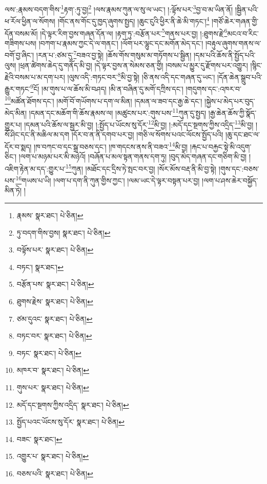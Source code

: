ལས་:རྣམས་བདག་གིས་\footnote{རྣམས་  སྣར་ཐང་།  པེ་ཅིན། }རྟག་:ཏུ་བྱ།\footnote{ཏུ་བདག་གིས་བྱས།  སྣར་ཐང་།  པེ་ཅིན། } །ལས་རྣམས་ཀུན་ལ་སུ་ལ་ཡང་། །:ལྟོས་པར་\footnote{བལྟོས་པར་  སྣར་ཐང་།  པེ་ཅིན། }བྱ་བ་མ་ཡིན་ནོ། །སྦྱིན་པའི་ཕ་རོལ་ཕྱིན་ལ་སོགས། །གོང་ནས་གོང་དུ་ཁྱད་ཞུགས་སྤྱད། །ཆུང་ངུའི་ཕྱིར་ནི་ཆེ་མི་གཏང་།\footnote{བཏང་།  སྣར་ཐང་། } །གཙོ་ཆེར་གཞན་གྱི་དོན་བསམ་མོ། །དེ་ལྟར་རིག་བྱས་གཞན་དོན་ལ། །རྟག་ཏུ་:བརྩོན་པར་\footnote{བརྩོན་པས་  སྣར་ཐང་།  པེ་ཅིན། }གནས་པར་བྱ། །:ཐུགས་རྗེ་\footnote{ཐུགས་རྗེས་  སྣར་ཐང་།  པེ་ཅིན། }མངའ་བ་རིང་གཟིགས་པས། །བཀག་པ་རྣམས་ཀྱང་དེ་ལ་གནང་། །ལོག་པར་ལྷུང་དང་མགོན་མེད་དང་། །བརྟུལ་ཞུགས་གནས་ལ་བགོ་བྱ་ཞིང་། །རན་པ་:ཙམ་དུ་\footnote{ཙམ་དུའང་  སྣར་ཐང་།  པེ་ཅིན། }བཟའ་བྱ་སྟེ། །ཆོས་གོས་གསུམ་མ་གཏོགས་པ་སྦྱིན། །དམ་པའི་ཆོས་ནི་སྤྱོད་པའི་ལུས། །ཕྲན་ཚེགས་ཆེད་དུ་གནོད་མི་བྱ། །དེ་ལྟར་བྱས་ན་སེམས་ཅན་གྱི། །བསམ་པ་མྱུར་དུ་རྫོགས་པར་འགྱུར། །སྙིང་རྗེའི་བསམ་པ་མ་དག་པར། །ལུས་འདི་:གཏང་བར་\footnote{བཏང་བར་  སྣར་ཐང་།  པེ་ཅིན། }མི་བྱ་སྟེ། །ཅི་ནས་འདི་དང་གཞན་དུ་ཡང་། །དོན་ཆེན་སྒྲུབ་པའི་རྒྱུར་གཏང་\footnote{བཏང་  སྣར་ཐང་།  པེ་ཅིན། }ངོ། །མ་གུས་པ་ལ་ཆོས་མི་བཤད། །མི་ན་བཞིན་དུ་མགོ་དཀྲིས་དང་། །གདུགས་དང་:འཁར་བ་\footnote{མཁར་བ་  སྣར་ཐང་།  པེ་ཅིན། }མཚོན་ཐོགས་དང་། །མགོ་བོ་གཡོགས་པ་དག་ལ་མིན། །དམན་ལ་ཟབ་དང་རྒྱ་ཆེ་དང་། །སྐྱེས་པ་མེད་པར་བུད་མེད་མིན། །དམན་དང་མཆོག་གི་ཆོས་རྣམས་ལ། །མཚུངས་པར་:གུས་པས་\footnote{གུས་པར་  སྣར་ཐང་།  པེ་ཅིན། }ཀུན་དུ་སྤྱད། །རྒྱ་ཆེན་ཆོས་ཀྱི་སྣོད་གྱུར་པ། །དམན་པའི་ཆོས་ལ་སྦྱར་མི་བྱ། །:སྤྱོད་པ་ཡོངས་སུ་དོར་\footnote{མདོ་དང་སྔགས་ཀྱིས་འདྲིད་  སྣར་ཐང་།  པེ་ཅིན། }མི་བྱ། །:མདོ་དང་སྔགས་ཀྱིས་འདྲིད་\footnote{སྤྱོད་པའང་ཡོངས་སུ་དོར་  སྣར་ཐང་།  པེ་ཅིན། }མི་བྱ། །སོ་ཤིང་དང་ནི་མཆིལ་མ་དག །དོར་བ་ན་ནི་དགབ་པར་བྱ། །གཅི་ལ་སོགས་པའང་ལོངས་སྤྱོད་པའི། །ཆུ་དང་ཐང་ལ་དོར་བ་སྨད། །ཁ་བཀང་བ་དང་སྒྲ་བཅས་དང་། །ཁ་གདངས་ནས་ནི་བཟའ་\footnote{བཟང་  སྣར་ཐང་། }མི་བྱ། །རྐང་པ་བརྐྱང་སྟེ་མི་འདུག་ཅིང་། །ལག་པ་མཉམ་པར་མི་མཉེའོ། །བཞོན་པ་མལ་སྟན་གནས་དག་ཏུ། །བུད་མེད་གཞན་དང་གཅིག་མི་བྱ། །འཇིག་རྟེན་མ་དད་:གྱུར་པ་\footnote{འགྱུར་པ་  སྣར་ཐང་།  པེ་ཅིན། }ཀུན། །མཐོང་དང་དྲིས་ཏེ་སྤང་བར་བྱ། །སོར་མོས་བརྡ་ནི་མི་བྱ་སྟེ། །གུས་དང་:བཅས་པས་\footnote{བཅས་པའི་  སྣར་ཐང་།  པེ་ཅིན། }གཡས་པ་ཡི། །ལག་པ་དག་ནི་ཀུན་གྱིས་ཀྱང་། །ལམ་ཡང་དེ་ལྟར་བསྟན་པར་བྱ། །ལག་པ་ཤས་ཆེར་བསྐྱོད་མིན་ཏེ། །
